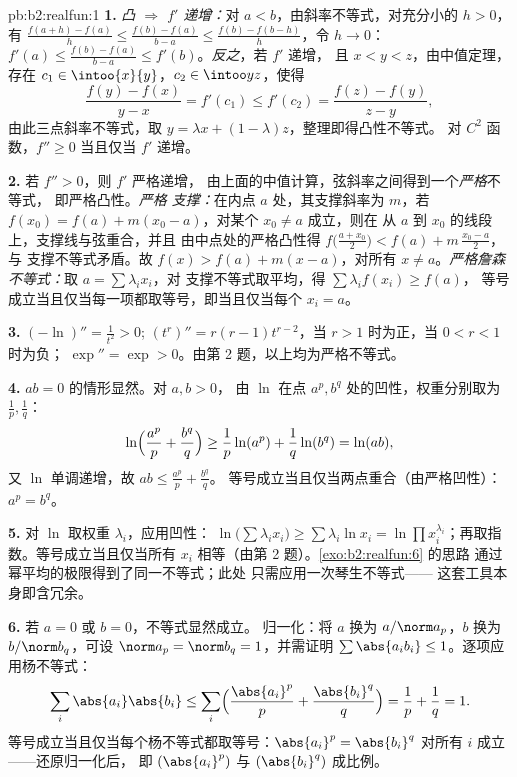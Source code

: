 \begin{solution}{pb:b2:realfun:1}
\textbf{1.} \emph{凸 $\Rightarrow$ $f'$ 递增：}对 $a <
b$，由斜率不等式，对充分小的 $h > 0$，有 $\frac{f(a+h)
- f(a)}h \leq \frac{f(b) - f(a)}{b-a} \leq \frac{f(b) -
f(b-h)}{h}$，令 $h \to 0$：$f'(a) \leq \frac{f(b) -
f(a)}{b - a} \leq f'(b)$。\emph{反之}，若 $f'$ 递增，
且 $x < y < z$，由中值定理，存在 $c_1 \in
\intoo{x}{y}$，$c_2 \in \intoo yz$，使得
\[
\frac{f(y) - f(x)}{y - x} = f'(c_1) \leq f'(c_2)
= \frac{f(z) - f(y)}{z - y},
\]
由此三点斜率不等式，取 $y = \lambda
x + (1 - \lambda)z$，整理即得凸性不等式。
对 $C^2$ 函数，$f'' \geq 0$ 当且仅当 $f'$ 递增。

\textbf{2.} 若 $f'' > 0$，则 $f'$ 严格递增，
由上面的中值计算，弦斜率之间得到一个\emph{严格}不等式，
即严格凸性。\emph{严格
支撑：}在内点 $a$ 处，其支撑斜率为 $m$，若 $f(x_0) =
f(a) + m(x_0 - a)$，对某个 $x_0 \neq a$ 成立，则在
从 $a$ 到 $x_0$ 的线段上，支撑线与弦重合，并且
由中点处的严格凸性得 $f\bigl(\frac{a +
x_0}2\bigr) < f(a) + m\,\frac{x_0 - a}2$，与
支撑不等式矛盾。故 $f(x) > f(a) + m(x - a)$，对所有 $x \neq
a$。\emph{严格詹森不等式：}取 $a = \sum\lambda_ix_i$，对
支撑不等式取平均，得 $\sum\lambda_if(x_i) \geq f(a)$，
等号成立当且仅当每一项都取等号，即当且仅当每个 $x_i
= a$。

\textbf{3.} $(-\ln)'' = \frac1{t^2} > 0$; $(t^r)'' = r(r -
1)t^{r-2}$，当 $r > 1$ 时为正，当 $0 < r < 1$ 时为负；
$\exp'' = \exp > 0$。由第 2 题，以上均为严格不等式。

\textbf{4.} $ab = 0$ 的情形显然。对 $a, b > 0$，
由 $\ln$ 在点 $a^p, b^q$ 处的凹性，权重分别取为
$\frac1p, \frac1q$：
\[
\ln\Bigl(\frac{a^p}p + \frac{b^q}q\Bigr) \geq
\frac1p\ln(a^p) + \frac1q\ln(b^q) = \ln(ab),
\]
又 $\ln$ 单调递增，故 $ab \leq \frac{a^p}p + \frac{b^q}q$。
等号成立当且仅当两点重合（由严格凹性）：$a^p =
b^q$。

\textbf{5.} 对 $\ln$ 取权重 $\lambda_i$，应用凹性：
$\ln\bigl(\sum\lambda_ix_i\bigr) \geq \sum\lambda_i\ln x_i =
\ln\prod x_i^{\lambda_i}$；再取指数。等号成立当且仅当所有 $x_i$ 
相等（由第 2 题）。\cref{exo:b2:realfun:6} 的思路
通过幂平均的极限得到了同一不等式；此处
只需应用一次琴生不等式——
这套工具本身即含冗余。

\textbf{6.} 若 $a = 0$ 或 $b = 0$，不等式显然成立。
归一化：将 $a$ 换为 $a/\norm a_p$，$b$ 换为 $b/\norm
b_q$，可设 $\norm a_p = \norm b_q = 1$，并需证明
$\sum\abs{a_ib_i} \leq 1$。逐项应用杨不等式：
\[
\sum_i\abs{a_i}\abs{b_i} \leq
\sum_i\Bigl(\frac{\abs{a_i}^p}{p} +
\frac{\abs{b_i}^q}{q}\Bigr) = \frac1p + \frac1q = 1 .
\]
等号成立当且仅当每个杨不等式都取等号：$\abs{a_i}^p =
\abs{b_i}^q$ 对所有 $i$ 成立——还原归一化后，
即 $(\abs{a_i}^p)$ 与 $(\abs{b_i}^q)$ 成比例。


\end{solution}
